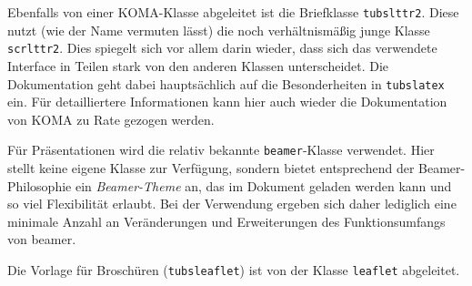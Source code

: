 Ebenfalls von einer KOMA-Klasse abgeleitet ist die Briefklasse
\texttt{tubslttr2}.
Diese nutzt (wie der Name vermuten lässt) die noch verhältnismäßig junge
Klasse \texttt{scrlttr2}. Dies spiegelt sich vor allem darin wieder, dass sich
das verwendete Interface in Teilen stark von den anderen Klassen unterscheidet.
Die Dokumentation geht dabei hauptsächlich auf die Besonderheiten in
\texttt{tubslatex} ein.
Für detailliertere Informationen kann hier auch wieder die Dokumentation von
KOMA\cite{koma-skript} zu Rate gezogen werden.

Für Präsentationen wird die relativ bekannte \texttt{beamer}-Klasse verwendet.
Hier stellt \tubslatex keine eigene Klasse zur Verfügung,
sondern bietet entsprechend der Beamer-Philosophie ein \emph{Beamer-Theme} an,
das im Dokument geladen werden kann und so viel Flexibilität erlaubt.
Bei der Verwendung ergeben sich daher lediglich eine minimale Anzahl an
Veränderungen und Erweiterungen des Funktionsumfangs von beamer.

Die Vorlage für Broschüren (\texttt{tubsleaflet}) ist
von der Klasse \texttt{leaflet} abgeleitet.


